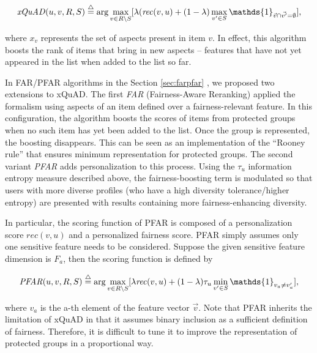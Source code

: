 \begin{equation}
    \mathit{xQuAD}(u,v,R,S)\buildrel\triangle\over= \arg\max_{v \in R \setminus S} [\lambda  (\mathit{rec}(v,u) + (1 - \lambda) \max_{v' \in S} \mathds{1}_{\vec{v} \cap \Vec{v'} = \emptyset}],
\label{eq:xquad}
\end{equation}
\vspace{0.25cm}

\noindent where $x_v$ represents the set of aspects present in item $v$. In effect, this algorithm boosts the rank of items that bring in new aspects -- features that have not yet appeared in the list when added to the list so far. 

In FAR/PFAR algorithms in the Section \ref{sec:farpfar} \cite{liu2018personalizing,liu2019personalized}, we proposed two extensions to xQuAD. The first \textit{FAR} (Fairness-Aware Reranking) applied the formalism using aspects of an item defined over a fairness-relevant feature. In this configuration, the algorithm boosts the scores of items from protected groups when no such item has yet been added to the list. Once the group is represented, the boosting disappears. This can be seen as an implementation of the ``Rooney rule'' \cite{kleinberg2018selection} that ensures minimum representation for protected groups. The second variant \textit{PFAR} adds personalization to this process. Using the $\tau_u$ information entropy measure described above, the fairness-boosting term is modulated so that users with more diverse profiles (who have a high diversity tolerance/higher entropy) are presented with results containing more fairness-enhancing diversity.

In particular, the scoring function of PFAR is composed of a personalization score $\mathit{rec}(v,u)$ and a personalized fairness score. PFAR simply assumes only one sensitive feature needs to be considered. Suppose the given sensitive feature dimension is $F_a$, then the scoring function is defined by

\begin{equation}
    \mathit{PFAR}(u,v,R,S)\buildrel\triangle\over= \arg\max_{v \in R \setminus S}[\lambda\mathit{rec}(v,u) + (1-\lambda)\tau_u \min_{v' \in S} \mathds{1}_{v_{a} \neq v'_{a}}],
\end{equation}
\vspace{0.25cm}

where $v_{a}$ is the a-th element of the feature vector $\vec{v}$.
Note that PFAR inherits the limitation of xQuAD in that it assumes binary inclusion as a sufficient definition of fairness. Therefore, it is difficult to tune it to improve the representation of protected groups in a proportional way. 


